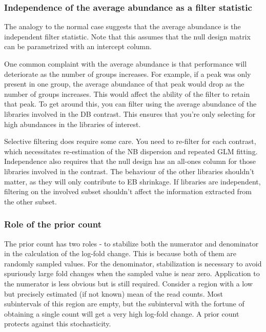 \documentclass[12pt]{report}
\begin{document}
\subsubsection*{Independence of the average abundance as a filter statistic}

The analogy to the normal case suggests that the average abundance is the independent filter statistic.
Note that this assumes that the null design matrix can be parametrized with an intercept column.

One common complaint with the average abundance is that performance will deteriorate as the number of groups increases.
For example, if a peak was only present in one group, the average abundance of that peak would drop as the number of groups increases.
This would affect the ability of the filter to retain that peak.
To get around this, you can filter using the average abundance of the libraries involved in the DB contrast.
This ensures that you're only selecting for high abundances in the libraries of interest.

Selective filtering does require some care.
You need to re-filter for each contrast, which necessitates re-estimation of the NB dispersion and repeated GLM fitting.
Independence also requires that the null design has an all-ones column for those libraries involved in the contrast.
The behaviour of the other libraries shouldn't matter, as they will only contribute to EB shrinkage.
If libraries are independent, filtering on the involved subset shouldn't affect the information extracted from the other subset.


\subsubsection*{Role of the prior count}

The prior count has two roles - to stabilize both the numerator and denominator in the calculation of the log-fold change.
This is because both of them are randomly sampled values.
For the denominator, stabilization is necessary to avoid spuriously large fold changes when the sampled value is near zero.
Application to the numerator is less obvious but is still required.
Consider a region with a low but precisely estimated (if not known) mean of the read counts. 
Most subintervals of this region are empty, but the subinterval with the fortune of obtaining a single count will get a very high log-fold change.
A prior count protects against this stochasticity.
\end{document}
